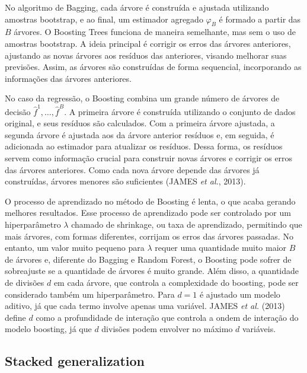 \documentclass[
  12pt,
  a4paper,
]{scrreprt}
\begin{document}
No algoritmo de Bagging, cada árvore é construída e ajustada utilizando
amostras bootstrap, e ao final, um estimador agregado
\(\varphi_B\)\hspace{0pt} é formado a partir das \(B\) árvores. O
Boosting Trees funciona de maneira semelhante, mas sem o uso de amostras
bootstrap. A ideia principal é corrigir os erros das árvores anteriores,
ajustando as novas árvores aos resíduos das anteriores, visando melhorar
suas previsões. Assim, as árvores são construídas de forma sequencial,
incorporando as informações das árvores anteriores.

\vspace{12pt}

No caso da regressão, o Boosting combina um grande número de árvores de
decisão \(\hat{f}^1, \dots, \hat{f}^B\). A primeira árvore é construída
utilizando o conjunto de dados original, e seus resíduos são calculados.
Com a primeira árvore ajustada, a segunda árvore é ajustada aos da
árvore anterior resíduos e, em seguida, é adicionada ao estimador para
atualizar os resíduos. Dessa forma, os resíduos servem como informação
crucial para construir novas árvores e corrigir os erros das árvores
anteriores. Como cada nova árvore depende das árvores já construídas,
árvores menores são suficientes (JAMES \emph{et al.}, 2013).

\vspace{12pt}

O processo de aprendizado no método de Boosting é lenta, o que acaba
gerando melhores resultados. Esse processo de aprendizado pode ser
controlado por um hiperparâmetro \(\lambda\) chamado de shrinkage, ou
taxa de aprendizado, permitindo que mais árvores, com formas diferentes,
corrijam os erros das árvores passadas. No entanto, um valor muito
pequeno para \(\lambda\) requer uma quantidade muito maior \(B\) de
árvores e, diferente do Bagging e Random Forest, o Boosting pode sofrer
de sobreajuste se a quantidade de árvores é muito grande. Além disso, a
quantidade de divisões \(d\) em cada árvore, que controla a complexidade
do boosting, pode ser considerado também um hiperparâmetro. Para
\(d = 1\) é ajustado um modelo aditivo, já que cada termo involve apenas
uma variável. JAMES \emph{et al.} (2013) define \(d\) como a
profundidade de interação que controla a ondem de interação do modelo
boosting, já que \(d\) divisões podem envolver no máximo \(d\)
variáveis.

\subsection{Stacked generalization}\label{stacked-generalization}
\end{document}
